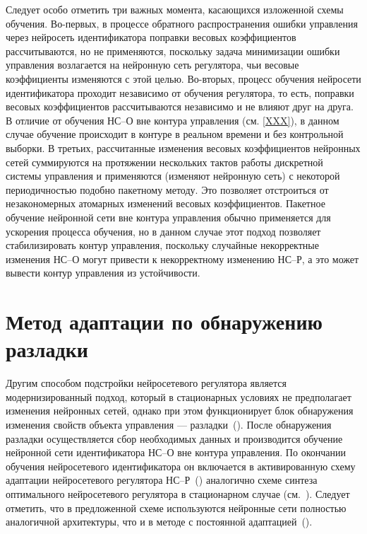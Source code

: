Следует особо отметить три важных момента, касающихся изложенной схемы
обучения.  Во-первых, в процессе обратного распространения ошибки
управления через нейросеть идентификатора поправки весовых
коэффициентов рассчитываются, но не применяются, поскольку задача
минимизации ошибки управления возлагается на нейронную сеть
регулятора, чьи весовые коэффициенты изменяются с этой целью.
Во-вторых, процесс обучения нейросети идентификатора проходит
независимо от обучения регулятора, то есть, поправки весовых
коэффициентов рассчитываются независимо и не влияют друг на друга.  В
отличие от обучения НС--О вне контура управления (см. \ref{XXX}), в
данном случае обучение происходит в контуре в реальном времени и без
контрольной выборки.  В третьих, рассчитанные изменения весовых
коэффициентов нейронных сетей суммируются на протяжении нескольких
тактов работы дискретной системы управления и применяются (изменяют
нейронную сеть) с некоторой периодичностью подобно пакетному методу.
Это позволяет отстроиться от незакономерных атомарных изменений
весовых коэффициентов.  Пакетное обучение нейронной сети вне контура
управления обычно применяется для ускорения процесса обучения, но в
данном случае этот подход позволяет стабилизировать контур управления,
поскольку случайные некорректные изменения НС--О могут привести к
некорректному изменению НС--Р, а это может вывести контур управления из
устойчивости.

\section{Метод адаптации по обнаружению разладки}

Другим способом подстройки нейросетевого регулятора является
модернизированный подход, который в стационарных условиях не
предполагает изменения нейронных сетей, однако при этом функционирует
блок обнаружения изменения свойств объекта управления ---
разладки~().  После обнаружения разладки
осуществляется сбор необходимых данных и производится обучение
нейронной сети идентификатора НС--О вне контура управления.  По
окончании обучения нейросетевого идентификатора он включается в
активированную схему адаптации нейросетевого регулятора
НС--Р~() аналогично схеме синтеза
оптимального нейросетевого регулятора в стационарном случае
(см.~\cite{XXX}).  Следует отметить, что в предложенной схеме
используются нейронные сети полностью аналогичной архитектуры, что и в
методе с постоянной адаптацией~().

